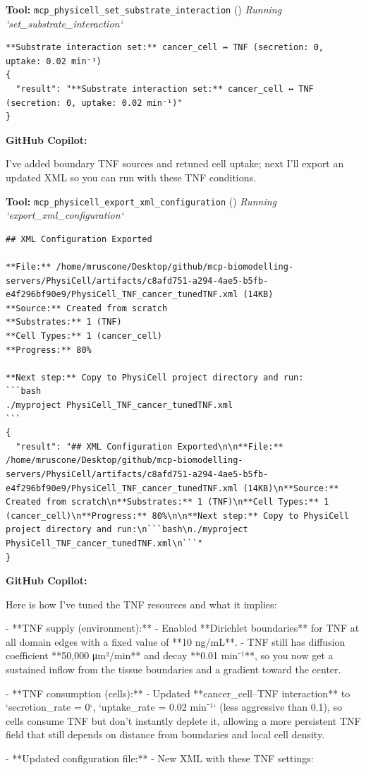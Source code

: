 \documentclass[11pt,a4paper]{article}
\begin{document}
\begin{toolokbox}
\textbf{Tool:} \texttt{mcp\_physicell\_set\_substrate\_interaction} (\checkmark)
\textit{Running `set\_substrate\_interaction`}
\begin{lstlisting}
**Substrate interaction set:** cancer_cell ↔ TNF (secretion: 0, uptake: 0.02 min⁻¹)
{
  "result": "**Substrate interaction set:** cancer_cell ↔ TNF (secretion: 0, uptake: 0.02 min⁻¹)"
}
\end{lstlisting}
\end{toolokbox}
\begin{copilotbox}
\textbf{GitHub Copilot:}

I’ve added boundary TNF sources and retuned cell uptake; next I’ll export an updated XML so you can run with these TNF conditions.

\end{copilotbox}
\begin{toolokbox}
\textbf{Tool:} \texttt{mcp\_physicell\_export\_xml\_configuration} (\checkmark)
\textit{Running `export\_xml\_configuration`}
\begin{lstlisting}
## XML Configuration Exported

**File:** /home/mruscone/Desktop/github/mcp-biomodelling-servers/PhysiCell/artifacts/c8afd751-a294-4ae5-b5fb-e4f296bf90e9/PhysiCell_TNF_cancer_tunedTNF.xml (14KB)
**Source:** Created from scratch
**Substrates:** 1 (TNF)
**Cell Types:** 1 (cancer_cell)
**Progress:** 80%

**Next step:** Copy to PhysiCell project directory and run:
```bash
./myproject PhysiCell_TNF_cancer_tunedTNF.xml
```
{
  "result": "## XML Configuration Exported\n\n**File:** /home/mruscone/Desktop/github/mcp-biomodelling-servers/PhysiCell/artifacts/c8afd751-a294-4ae5-b5fb-e4f296bf90e9/PhysiCell_TNF_cancer_tunedTNF.xml (14KB)\n**Source:** Created from scratch\n**Substrates:** 1 (TNF)\n**Cell Types:** 1 (cancer_cell)\n**Progress:** 80%\n\n**Next step:** Copy to PhysiCell project directory and run:\n```bash\n./myproject PhysiCell_TNF_cancer_tunedTNF.xml\n```"
}
\end{lstlisting}
\end{toolokbox}
\begin{copilotbox}
\textbf{GitHub Copilot:}

Here is how I’ve tuned the TNF resources and what it implies:

- **TNF supply (environment):**
  - Enabled **Dirichlet boundaries** for TNF at all domain edges with a fixed value of **10 ng/mL**.
  - TNF still has diffusion coefficient **50,000 μm²/min** and decay **0.01 min⁻¹**, so you now get a sustained inflow from the tissue boundaries and a gradient toward the center.

- **TNF consumption (cells):**
  - Updated **cancer\_cell–TNF interaction** to `secretion\_rate = 0`, `uptake\_rate = 0.02 min⁻¹` (less aggressive than 0.1), so cells consume TNF but don’t instantly deplete it, allowing a more persistent TNF field that still depends on distance from boundaries and local cell density.

- **Updated configuration file:**
  - New XML with these TNF settings:

\end{copilotbox}
\end{document}
